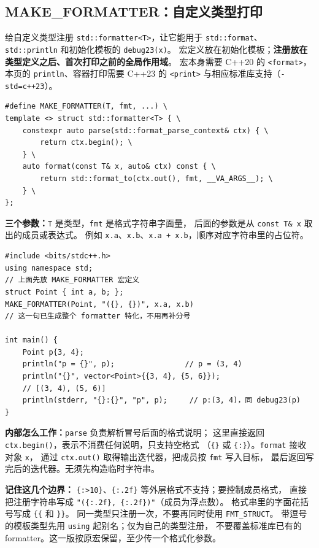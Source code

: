 \subsection{MAKE\_FORMATTER：自定义类型打印}

给自定义类型注册 \texttt{std::formatter<T>}，让它能用于
\texttt{std::format}、\texttt{std::println} 和初始化模板的 \texttt{debug23(x)}。
宏定义放在初始化模板；\textbf{注册放在类型定义之后、首次打印之前的全局作用域}。
宏本身需要 C++20 的 \texttt{<format>}，本页的 \texttt{println}、容器打印需要
C++23 的 \texttt{<print>} 与相应标准库支持（\texttt{-std=c++23}）。

\begin{verbatim}
#define MAKE_FORMATTER(T, fmt, ...) \
template <> struct std::formatter<T> { \
    constexpr auto parse(std::format_parse_context& ctx) { \
        return ctx.begin(); \
    } \
    auto format(const T& x, auto& ctx) const { \
        return std::format_to(ctx.out(), fmt, __VA_ARGS__); \
    } \
};
\end{verbatim}

\textbf{三个参数：}\texttt{T} 是类型，\texttt{fmt} 是格式字符串字面量，
后面的参数是从 \texttt{const T\& x} 取出的成员或表达式。
例如 \texttt{x.a}、\texttt{x.b}、\texttt{x.a + x.b}，顺序对应字符串里的占位符。

\begin{verbatim}
#include <bits/stdc++.h>
using namespace std;
// 上面先放 MAKE_FORMATTER 宏定义
struct Point { int a, b; };
MAKE_FORMATTER(Point, "({}, {})", x.a, x.b)
// 这一句已生成整个 formatter 特化，不用再补分号

int main() {
    Point p{3, 4};
    println("p = {}", p);                // p = (3, 4)
    println("{}", vector<Point>{{3, 4}, {5, 6}});
    // [(3, 4), (5, 6)]
    println(stderr, "{}:{}", "p", p);     // p:(3, 4)，同 debug23(p)
}
\end{verbatim}

\textbf{内部怎么工作：}\texttt{parse} 负责解析冒号后面的格式说明；
这里直接返回 \texttt{ctx.begin()}，表示不消费任何说明，只支持空格式
（\texttt{\{\}} 或 \texttt{\{:\}}）。\texttt{format} 接收对象 \texttt{x}，
通过 \texttt{ctx.out()} 取得输出迭代器，把成员按 \texttt{fmt} 写入目标，
最后返回写完后的迭代器。无须先构造临时字符串。

\textbf{记住这几个边界：}
\texttt{\{:>10\}}、\texttt{\{:.2f\}} 等外层格式不支持；要控制成员格式，
直接把注册字符串写成 \texttt{"(\{:.2f\}, \{:.2f\})"}（成员为浮点数）。
格式串里的字面花括号写成 \texttt{\{\{} 和 \texttt{\}\}}。
同一类型只注册一次，不要再同时使用 \texttt{FMT\_STRUCT}。
带逗号的模板类型先用 \texttt{using} 起别名；仅为自己的类型注册，
不要覆盖标准库已有的 formatter。这一版按原宏保留，至少传一个格式化参数。
